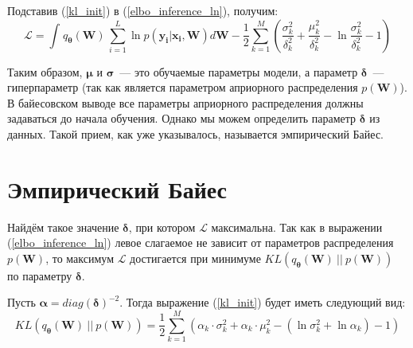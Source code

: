\documentclass{article}
\numberwithin{equation}{section}
\begin{document}
    Подставив (\ref{kl_init}) в (\ref{elbo_inference_ln}), получим:
    \begin{equation}\label{elbo_kl}
        \mathcal{L}
        =
            \int_{}{
                q_{\pmb{\theta}}(\pmb{W})
                \,
                \sum_{i=1}^{L}{
                    \ln{
                        p(\pmb{y_{i}} | \pmb{x_{i}}, \pmb{W})
                    }
                }
                d\pmb{W}
            }
            -
            \frac{1}{2} \sum_{k=1}^{M}(
                \frac
                    {\sigma_{k}^2}
                    {\delta_{k}^2}
                +
                \frac
                    {\mu_{k}^2}
                    {\delta_{k}^2}
                -
                \ln{
                    \frac
                        {\sigma_{k}^2}
                        {\delta_{k}^2}
                }
                - 1
            )
    \end{equation}

    Таким образом,
    $\pmb{\mu}$ и $\pmb{\sigma}$~--- это обучаемые параметры модели,
    а параметр $\pmb{\delta}$~--- гиперпараметр
    (так как является параметром априорного распределения $p(\pmb{W})$).
    В байесовском выводе все параметры априорного распределения
    должны задаваться до начала обучения.
    Однако мы можем определить параметр $\pmb{\delta}$ из данных.
    Такой прием, как уже указывалось, называется эмпирический Байес.

    \section{Эмпирический Байес}
    Найдём такое значение $\pmb{\delta}$, при котором $\mathcal{L}$ максимальна.
    Так как в выражении (\ref{elbo_inference_ln})
    левое слагаемое не зависит от параметров распределения
    $p(\pmb{W})$, то максимум $\mathcal{L}$ достигается при минимуме
    $KL(q_{\pmb{\theta}}(\pmb{W})~||~p(\pmb{W}))$ по параметру $\pmb{\delta}$.

    Пусть $\pmb{\alpha} = diag(\pmb{\delta})^{-2}$.
    Тогда выражение (\ref{kl_init}) будет иметь следующий вид:
    \begin{equation}\label{kl_init_alpha}
        KL(
            q_{\pmb{\theta}}(\pmb{W})~||~p(\pmb{W})
        )
        =
            \frac{1}{2} \sum_{k=1}^{M} \left(
                \alpha_{k} \cdot \sigma_{k}^2
                + \alpha_{k} \cdot \mu_{k}^2
                - (\ln{\sigma_{k}^2} + \ln{\alpha_{k}})
                - 1
            \right)
    \end{equation}
\end{document}
